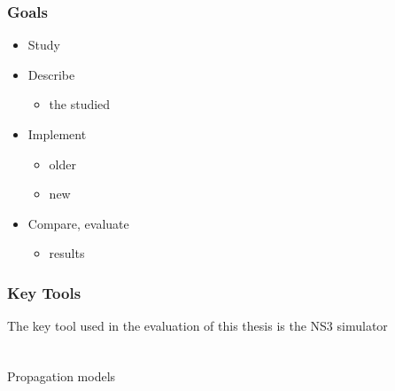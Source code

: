\documentclass[%
  12pt,       				%
	t,                  %
	aspectratio=1610,   %
	unicode,						%
]{beamer}				    	%
\begin{document}
\disablenavigationsymbols

\maketitle

\begin{frame} 
	\frametitle{Goals}
	\begin{itemize}
			\item Study
			\item Describe
				\begin{itemize}
					\item the studied
				\end{itemize}
			\item Implement
				\begin{itemize}
					\item older
					\item new
				\end{itemize}
			\item Compare, evaluate
				\begin{itemize}
						\item results
				\end{itemize}
	\end{itemize}
\end{frame}

\begin{frame} 
	\frametitle{Key Tools}

	\begin{alertblock}{The key tool used in the evaluation of this thesis is the NS3 simulator}
		
	\end{alertblock}

	\vspace{4ex}

	\begin{block}{}
		
	\end{block}
\end{frame} 


\begin{frame} 
	\frametitle{}
	
	\begin{columns}[T] 								%
		\begin{column}{0.4\textwidth}		%
			Propagation models\\[2ex]
			
		\end{column}
		
	\end{columns}											%
\end{frame}
\end{document}
